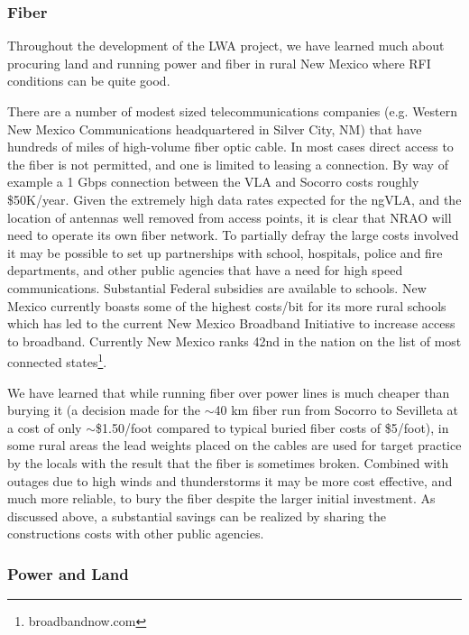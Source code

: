 \documentclass[11pt]{article}
\begin{document}
\subsubsection{Fiber}

Throughout the development of the LWA project, we have learned much
about procuring land and running power and fiber in rural New Mexico
where RFI conditions can be quite good. 

There are a number of modest sized telecommunications companies (e.g. Western New Mexico Communications headquartered in Silver City, NM) that have hundreds of miles of high-volume fiber optic cable.  In most cases direct access to the fiber is not permitted, and one is limited to leasing a connection.  By way of example a 1 Gbps connection between the VLA and Socorro costs roughly \$50K/year.  Given the extremely high data rates expected for the ngVLA, and the location of antennas well removed from access points, it is clear that NRAO will need to operate its own fiber network.  To partially defray the large costs involved it may be possible to set up partnerships with school, hospitals, police and fire departments, and other public agencies that have a need for high speed communications.  Substantial Federal subsidies are available to schools.  New Mexico currently boasts some of the highest costs/bit for its more rural schools which has  led
to the current New Mexico Broadband Initiative to increase access to broadband.  Currently New Mexico ranks 42nd in the nation on the list of most connected states\footnote{broadbandnow.com}.

We have
learned that while running fiber over power lines is much cheaper than
burying it (a decision made for the $\sim$40 km fiber run from Socorro
to Sevilleta at a cost of only $\sim$\$1.50/foot compared to typical
buried fiber costs of \$5/foot), in some rural areas
the lead weights placed on the cables are used for target practice by
the locals with the result that the fiber is sometimes broken.
Combined with outages due to high winds and thunderstorms it may be
more cost effective, and much more reliable, to bury the fiber despite
the larger initial investment. As discussed above, a substantial savings can be realized by sharing the  constructions costs with other public agencies. 

\subsubsection{Power and Land}
\end{document}
